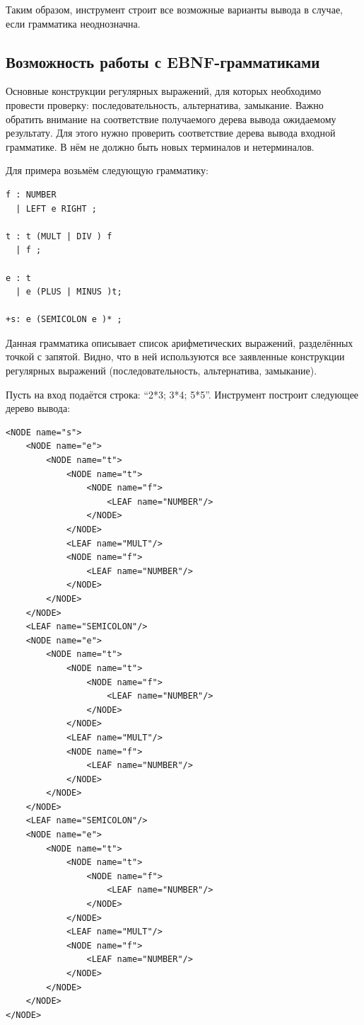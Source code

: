Таким образом, инструмент строит все возможные варианты вывода в случае, если грамматика неоднозначна.

\subsection{Возможность работы с EBNF-грамматиками} 

Основные конструкции регулярных выражений, для которых необходимо провести проверку: последовательность, альтернатива, замыкание. Важно обратить внимание на соответствие получаемого дерева вывода ожидаемому результату. Для этого нужно проверить соответствие дерева вывода входной грамматике. В нём не должно быть новых терминалов и нетерминалов.

Для примера возьмём следующую грамматику:
\begin{verbatim}
f : NUMBER 
  | LEFT e RIGHT ;  
  
t : t (MULT | DIV ) f 
  | f ;
  
e : t 
  | e (PLUS | MINUS )t; 
  
+s: e (SEMICOLON e )* ;

\end{verbatim}

Данная грамматика описывает список арифметических выражений, разделённых точкой с запятой. Видно, что в ней используются все заявленные конструкции регулярных выражений (последовательность, альтернатива, замыкание).

Пусть на вход подаётся строка: "`2*3; 3*4; 5*5"'. Инструмент построит следующее дерево вывода:
\begin{verbatim}
<NODE name="s">
    <NODE name="e">
        <NODE name="t">
            <NODE name="t">
                <NODE name="f">
                    <LEAF name="NUMBER"/>
                </NODE>
            </NODE>
            <LEAF name="MULT"/>
            <NODE name="f">
                <LEAF name="NUMBER"/>
            </NODE>
        </NODE>
    </NODE>
    <LEAF name="SEMICOLON"/>
    <NODE name="e">
        <NODE name="t">
            <NODE name="t">
                <NODE name="f">
                    <LEAF name="NUMBER"/>
                </NODE>
            </NODE>
            <LEAF name="MULT"/>
            <NODE name="f">
                <LEAF name="NUMBER"/>
            </NODE>
        </NODE>
    </NODE>
    <LEAF name="SEMICOLON"/>
    <NODE name="e">
        <NODE name="t">
            <NODE name="t">
                <NODE name="f">
                    <LEAF name="NUMBER"/>
                </NODE>
            </NODE>
            <LEAF name="MULT"/>
            <NODE name="f">
                <LEAF name="NUMBER"/>
            </NODE>
        </NODE>
    </NODE>
</NODE>
\end{verbatim}

